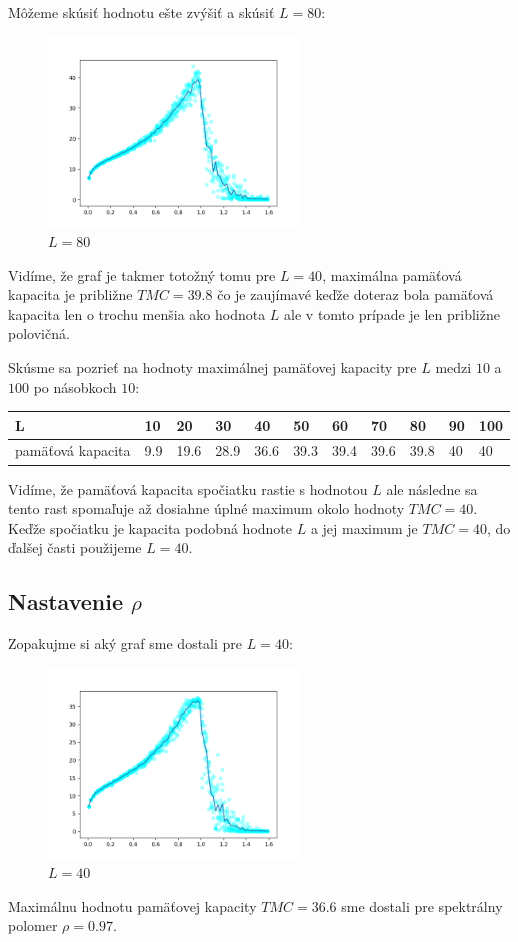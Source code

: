 \documentclass[a4paper]{article}
\begin{document}
	Môžeme skúsiť hodnotu ešte zvýšiť a skúsiť $L=80$:
	
	\begin{figure}[!h]
		\centering
		\includegraphics[width=0.6\textwidth]{../L_80.png}
		\caption{$L=80$}
	\end{figure}
	
	Vidíme, že graf je takmer totožný tomu pre $L=40$, maximálna pamäťová kapacita je približne $TMC=39.8$ čo je zaujímavé keďže doteraz bola pamäťová kapacita len o trochu menšia ako hodnota $L$ ale v tomto prípade je len približne polovičná. 
	\newpage
	
	Skúsme sa pozrieť na hodnoty maximálnej pamäťovej kapacity pre $L$ medzi $10$ a $100$ po násobkoch $10$:
	
	\begin{table}[!h]
		\begin{tabular}{|p{}|p{}|p{}|p{}|p{}|p{}|p{}|p{}|p{}|p{}|p{}|}
			\hline
			L& 10& 20& 30& 40& 50& 60& 70& 80& 90& 100 \\ \hline
			pamäťová kapacita & 9.9& 19.6& 28.9& 36.6& 39.3& 39.4& 39.6& 39.8& 40& 40\\ \hline
		\end{tabular}
	\end{table}
	
	Vidíme, že pamäťová kapacita spočiatku rastie s hodnotou $L$ ale následne sa tento rast spomaľuje až dosiahne úplné maximum okolo hodnoty $TMC=40$. Keďže spočiatku je kapacita podobná hodnote $L$ a jej maximum je $TMC=40$, do ďalšej časti použijeme $L=40$.
	
	\subsection*{Nastavenie $\rho$}
	
	Zopakujme si aký graf sme dostali pre $L=40$:
	
	\begin{figure}[!h]
		\centering
		\includegraphics[width=0.6\textwidth]{../L_40.png}
		\caption{$L=40$}
	\end{figure}

	Maximálnu hodnotu pamäťovej kapacity $TMC=36.6$ sme dostali pre spektrálny polomer $\rho=0.97$. 
	  
\end{document}
